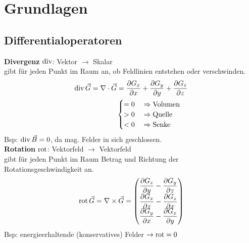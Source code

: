 \section{Grundlagen}
\subsection{Differentialoperatoren}

\textbf{Divergenz} $\operatorname{div}$: Vektor $\rightarrow$ Skalar\\
gibt für jeden Punkt im Raum an, ob Feldlinien entstehen oder verschwinden.
\begin{align*}
    \operatorname{div} \vec{G} = \nabla \cdot \vec{G}   =  \dfrac{\partial G_x}{\partial x} 
    + \dfrac{\partial G_y}{\partial y} + \dfrac{\partial G_z}{\partial z} \\
                                 \begin{cases}
    = 0 \quad\Rightarrow \textnormal{Volumen} \\
    > 0 \quad\Rightarrow \textnormal{Quelle}  \\
    < 0 \quad\Rightarrow \textnormal{Senke}
\end{cases}                                      
\end{align*}
Bsp: $\operatorname{div} \vec{B} = 0$, da mag. Felder in sich geschlossen.\\

\textbf{Rotation} $\operatorname{rot}$: Vektorfeld $\rightarrow$ Vektorfeld\\
gibt für jeden Punkt im Raum Betrag und Richtung der Rotationsgeschwindigkeit an.
\begin{align*}
\operatorname{rot} \vec{G} = \nabla \times \vec{G} = 
\begin{pmatrix}
    \dfrac{\partial G_z}{\partial y} - \dfrac{\partial G_y}{\partial z} \\
    \dfrac{\partial G_x}{\partial z} - \dfrac{\partial G_z}{\partial x} \\
    \dfrac{\partial G_y}{\partial x} - \dfrac{\partial G_x}{\partial y}
\end{pmatrix}
\end{align*}
Bsp: energieerhaltende (konservatives) Felder $ \rightarrow \operatorname{rot} = 0$\\

